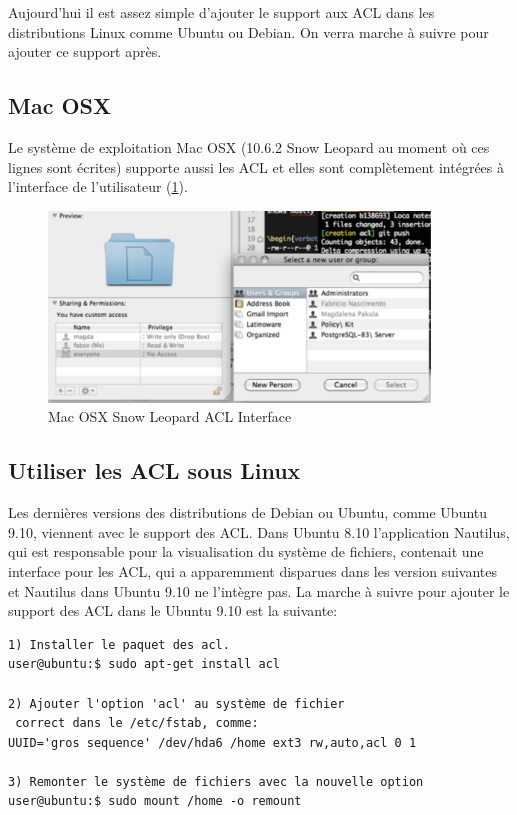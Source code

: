 \documentclass{article}
\begin{document}
Aujourd'hui il est assez simple d'ajouter le support aux ACL dans les distributions Linux comme Ubuntu ou Debian. On verra marche à suivre pour ajouter ce support après.

\subsection{Mac OSX}
Le système de exploitation Mac OSX (10.6.2 Snow Leopard au moment où ces lignes sont écrites) supporte aussi les ACL et elles sont complètement intégrées à l'interface de l'utilisateur (\ref{fig:img_mac-acl}). 

\begin{figure}[htbp]
	\centering
		\includegraphics[height=2in]{img/mac-acl.pdf}
	\caption{Mac OSX Snow Leopard ACL Interface}
	\label{fig:img_mac-acl}
\end{figure}

\subsection*{Utiliser les ACL sous Linux}


Les dernières versions des distributions de Debian ou Ubuntu, comme Ubuntu 9.10, viennent avec le support des ACL. Dans Ubuntu 8.10 l'application Nautilus, qui est responsable pour la visualisation du système de fichiers, contenait une interface pour les ACL, qui a apparemment disparues dans les version suivantes et Nautilus dans Ubuntu 9.10 ne l'intègre pas. La marche à suivre pour ajouter le support des ACL dans le Ubuntu 9.10 est la suivante:

\begin{verbatim}
1) Installer le paquet des acl. 
user@ubuntu:$ sudo apt-get install acl

2) Ajouter l'option 'acl' au système de fichier
 correct dans le /etc/fstab, comme:
UUID='gros sequence' /dev/hda6 /home ext3 rw,auto,acl 0 1

3) Remonter le système de fichiers avec la nouvelle option
user@ubuntu:$ sudo mount /home -o remount

\end{verbatim}
\end{document}
